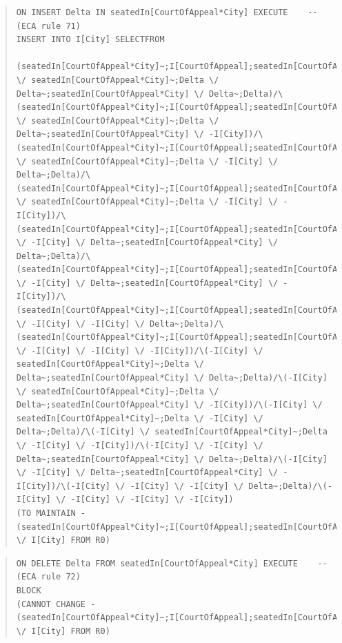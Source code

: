 \documentclass[10pt,a4paper]{report}              %
\theoremstyle{plain}\theorembodyfont{\rmfamily}\newtheorem{definition}{Definition}[section]
\theoremstyle{plain}\theorembodyfont{\rmfamily}\newtheorem{designrule}[definition]{Requirement}
\begin{document}
\begin{quote}
\begin{verbatim}
ON INSERT Delta IN seatedIn[CourtOfAppeal*City] EXECUTE    -- (ECA rule 71)
INSERT INTO I[City] SELECTFROM
  (seatedIn[CourtOfAppeal*City]~;I[CourtOfAppeal];seatedIn[CourtOfAppeal*City] \/ seatedIn[CourtOfAppeal*City]~;Delta \/ Delta~;seatedIn[CourtOfAppeal*City] \/ Delta~;Delta)/\(seatedIn[CourtOfAppeal*City]~;I[CourtOfAppeal];seatedIn[CourtOfAppeal*City] \/ seatedIn[CourtOfAppeal*City]~;Delta \/ Delta~;seatedIn[CourtOfAppeal*City] \/ -I[City])/\(seatedIn[CourtOfAppeal*City]~;I[CourtOfAppeal];seatedIn[CourtOfAppeal*City] \/ seatedIn[CourtOfAppeal*City]~;Delta \/ -I[City] \/ Delta~;Delta)/\(seatedIn[CourtOfAppeal*City]~;I[CourtOfAppeal];seatedIn[CourtOfAppeal*City] \/ seatedIn[CourtOfAppeal*City]~;Delta \/ -I[City] \/ -I[City])/\(seatedIn[CourtOfAppeal*City]~;I[CourtOfAppeal];seatedIn[CourtOfAppeal*City] \/ -I[City] \/ Delta~;seatedIn[CourtOfAppeal*City] \/ Delta~;Delta)/\(seatedIn[CourtOfAppeal*City]~;I[CourtOfAppeal];seatedIn[CourtOfAppeal*City] \/ -I[City] \/ Delta~;seatedIn[CourtOfAppeal*City] \/ -I[City])/\(seatedIn[CourtOfAppeal*City]~;I[CourtOfAppeal];seatedIn[CourtOfAppeal*City] \/ -I[City] \/ -I[City] \/ Delta~;Delta)/\(seatedIn[CourtOfAppeal*City]~;I[CourtOfAppeal];seatedIn[CourtOfAppeal*City] \/ -I[City] \/ -I[City] \/ -I[City])/\(-I[City] \/ seatedIn[CourtOfAppeal*City]~;Delta \/ Delta~;seatedIn[CourtOfAppeal*City] \/ Delta~;Delta)/\(-I[City] \/ seatedIn[CourtOfAppeal*City]~;Delta \/ Delta~;seatedIn[CourtOfAppeal*City] \/ -I[City])/\(-I[City] \/ seatedIn[CourtOfAppeal*City]~;Delta \/ -I[City] \/ Delta~;Delta)/\(-I[City] \/ seatedIn[CourtOfAppeal*City]~;Delta \/ -I[City] \/ -I[City])/\(-I[City] \/ -I[City] \/ Delta~;seatedIn[CourtOfAppeal*City] \/ Delta~;Delta)/\(-I[City] \/ -I[City] \/ Delta~;seatedIn[CourtOfAppeal*City] \/ -I[City])/\(-I[City] \/ -I[City] \/ -I[City] \/ Delta~;Delta)/\(-I[City] \/ -I[City] \/ -I[City] \/ -I[City])
(TO MAINTAIN -(seatedIn[CourtOfAppeal*City]~;I[CourtOfAppeal];seatedIn[CourtOfAppeal*City]) \/ I[City] FROM R0)
\end{verbatim}
\end{quote}
\begin{quote}
\begin{verbatim}
ON DELETE Delta FROM seatedIn[CourtOfAppeal*City] EXECUTE    -- (ECA rule 72)
BLOCK
(CANNOT CHANGE -(seatedIn[CourtOfAppeal*City]~;I[CourtOfAppeal];seatedIn[CourtOfAppeal*City]) \/ I[City] FROM R0)
\end{verbatim}
\end{quote}
\end{document}
